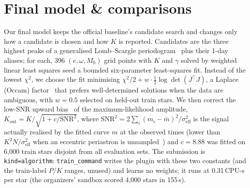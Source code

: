 \documentclass{article}
\begin{document}
\section{Final model \& comparisons}
Our final model keeps the official baseline's candidate search and changes only how a candidate is chosen and how
$K$ is reported. Candidates are the three highest peaks of a generalised Lomb--Scargle periodogram~\cite{zechmeister2009} plus their 1-day
aliases; for each, 396 $(e,\omega,M_0)$ grid points with $K$ and $\gamma$ solved by weighted linear least squares seed
a bounded six-parameter least-squares fit. Instead of the lowest $\chi^2$, we choose the fit minimising
$\chi^2/2 + w\cdot\tfrac12\log\det(J^\top J)$, a Laplace (Occam) factor~\cite{mackay2003} that prefers well-determined solutions
when the data are ambiguous, with $w=0.5$ selected on held-out train stars. We then correct the low-SNR upward bias~\cite{shen2008} of
the maximum-likelihood amplitude, $K_\mathrm{out}=K/\sqrt{1+c/\mathrm{SNR}^2}$, where $\mathrm{SNR}^2=2\sum_i(m_i-\bar m)^2/\sigma_\mathrm{eff}^2$
is the signal actually realised by the fitted curve $m$ at the observed times (lower than $K^2N/\sigma_\mathrm{eff}^2$ when an eccentric
periastron is unsampled~\cite{rvsnr2024}) and $c=8.88$ was fitted on 6,000 train stars disjoint from all evaluation sets. The submission is \texttt{kind=algorithm}:
\texttt{train\_command} writes the plugin with these two constants (and the train-label $P$/$K$ ranges, unused) and
learns no weights; it runs at 0.31\,CPU-s per star (the organizers' sandbox scored 4,000 stars in 155\,s).
\end{document}
